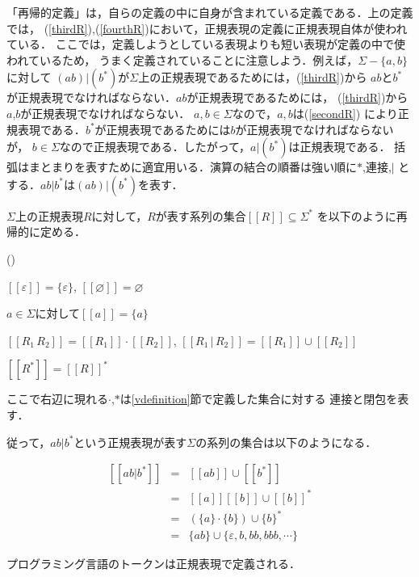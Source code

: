 \documentclass[a4j,dvipdfmx]{jbook}
\begin{document}
「再帰的定義」は，自らの定義の中に自身が含まれている定義である．上の定義では，
(\ref{thirdR}),(\ref{fourthR})において，正規表現の定義に正規表現自体が使われている．
ここでは，定義しようとしている表現よりも短い表現が定義の中で使われているため，
うまく定義されていることに注意しよう．例えば，$\Sigma-\{a,b\}$に対して
$(ab)|(b^\ast)$が$\Sigma$上の正規表現であるためには，(\ref{thirdR})から
$ab$と$b^\ast$が正規表現でなければならない．$ab$が正規表現であるためには，
(\ref{thirdR})から$a$,$b$が正規表現でなければならない．
$a,b\in\Sigma$なので，$a,b$は(\ref{secondR})
により正規表現である．$b^\ast$が正規表現であるためには$b$が正規表現でなければならないが，
$b\in\Sigma$なので正規表現である．したがって，$a|(b^\ast)$は正規表現である．
括弧はまとまりを表すために適宜用いる．演算の結合の順番は強い順に$\ast$,連接,$|$
とする．$ab|b^\ast$は$(ab)|(b^\ast)$を表す．

\begin{Def}
  $\Sigma$上の正規表現$R$に対して，$R$が表す系列の集合$[\![R]\!]\subseteq\Sigma^\ast$
  を以下のように再帰的に定める．
  \begin{list}{()}{}
    \item $[\![\varepsilon]\!]=\{\varepsilon\}$, $[\![\varnothing]\!]=\varnothing$
    \item $a\in\Sigma$に対して$[\![a]\!]=\{a\}$
    \item $[\![R_1\,R_2]\!]=[\![R_1]\!]\cdot[\![R_2]\!]$, $[\![R_1\,|\,R_2]\!]=
            [\![R_1]\!]\cup[\![R_2]\!]$
    \item $[\![R^\ast]\!]=[\![R]\!]^\ast$
  \end{list}
  ここで右辺に現れる$\cdot$,$\ast$は\ref{vdefinition}節で定義した集合に対する
  連接と閉包を表す．
\end{Def}

従って，$ab|b^\ast$という正規表現が表す$\Sigma$の系列の集合は以下のようになる．

\[\begin{array}{rcl}[\![ab|b^\ast]\!] & = & [\![ab]\!]\cup[\![b^\ast]\!]              \\
                                    & = & [\![a]\!][\![b]\!]\cup [\![b]\!]^\ast     \\
                                    & = & (\{a\}\cdot\{b\})\cup\{b\}^\ast           \\
                                    & = & \{ab\}\cup\{\varepsilon,b,bb,bbb,\cdots\}
  \end{array}\]

プログラミング言語のトークンは正規表現で定義される．
\end{document}
